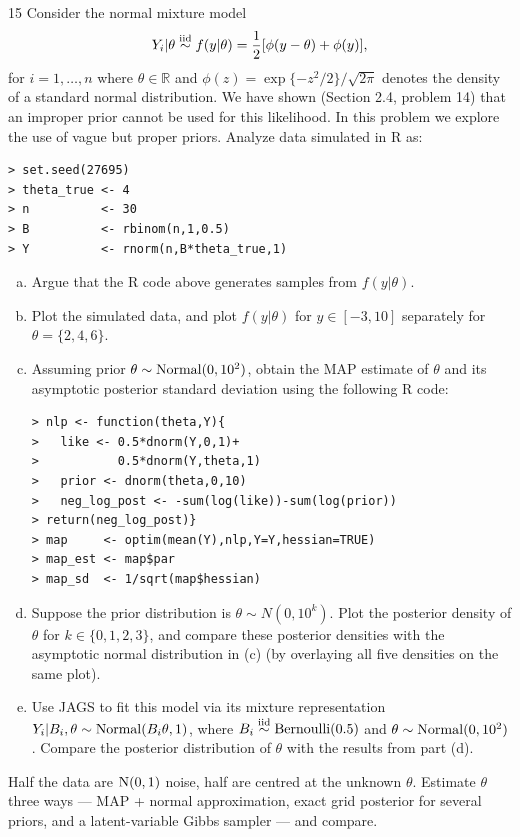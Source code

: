 \documentclass[11pt]{article}
\begin{document}
\begin{problem}{15}
Consider the normal mixture model
\[
Y_i|\theta\stackrel{\text{iid}}{\sim} f(y|\theta)=\frac12[\phi(y-\theta)+\phi(y)],
\]
for $i=1,\dots,n$ where $\theta\in\mathbb R$ and $\phi(z)=\exp\{-z^2/2\}/\sqrt{2\pi}$ denotes the density of a standard normal distribution. We have shown (Section 2.4, problem 14) that an improper prior cannot be used for this likelihood. In this problem we explore the use of vague but proper priors. Analyze data simulated in R as:
\begin{lstlisting}
> set.seed(27695)
> theta_true <- 4
> n          <- 30
> B          <- rbinom(n,1,0.5)
> Y          <- rnorm(n,B*theta_true,1)
\end{lstlisting}
\begin{enumerate}[(a)]
\item Argue that the R code above generates samples from $f(y|\theta)$.
\item Plot the simulated data, and plot $f(y|\theta)$ for $y\in[-3,10]$ separately for $\theta=\{2,4,6\}$.
\item Assuming prior $\theta\sim\mathrm{Normal}(0,10^2)$, obtain the MAP estimate of $\theta$ and its asymptotic posterior standard deviation using the following R code:
\begin{lstlisting}
> nlp <- function(theta,Y){
>   like <- 0.5*dnorm(Y,0,1)+
>           0.5*dnorm(Y,theta,1)
>   prior <- dnorm(theta,0,10)
>   neg_log_post <- -sum(log(like))-sum(log(prior))
> return(neg_log_post)}
> map     <- optim(mean(Y),nlp,Y=Y,hessian=TRUE)
> map_est <- map$par
> map_sd  <- 1/sqrt(map$hessian)
\end{lstlisting}
\item Suppose the prior distribution is $\theta\sim N(0,10^k)$. Plot the posterior density of $\theta$ for $k\in\{0,1,2,3\}$, and compare these posterior densities with the asymptotic normal distribution in (c) (by overlaying all five densities on the same plot).
\item Use JAGS to fit this model via its mixture representation $Y_i|B_i,\theta\sim\mathrm{Normal}(B_i\theta,1)$, where $B_i\stackrel{\text{iid}}{\sim}\mathrm{Bernoulli}(0.5)$ and $\theta\sim\mathrm{Normal}(0,10^2)$. Compare the posterior distribution of $\theta$ with the results from part (d).
\end{enumerate}
\end{problem}

\begin{restate}
Half the data are $\mathrm{N}(0,1)$ noise, half are centred at the unknown $\theta$. Estimate $\theta$ three ways --- MAP + normal approximation, exact grid posterior for several priors, and a latent-variable Gibbs sampler --- and compare.
\end{restate}
\end{document}
